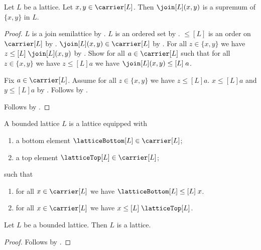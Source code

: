 \begin{proposition}\label{join_is_supremum_pair}
    Let $L$ be a lattice.
    Let $x,y\in\carrier[L]$.
    Then $\join[L](x,y)$ is a supremum of $\{x,y\}$ in $L$.
\end{proposition}
\begin{proof}
    $L$ is a join semilattice by .
    $L$ is an ordered set by .
    $\leq[L]$ is an order on $\carrier[L]$ by
        .
    $\join[L](x,y)\in\carrier[L]$ by .
    For all $z\in\{x,y\}$ we have
        $z\mathrel{\leq[L]}\join[L](x,y)$ by
        .
    Show for all $a\in\carrier[L]$ such that
        for all $z\in\{x,y\}$ we have $z\mathrel{\leq[L]}a$
        we have $\join[L](x,y)\mathrel{\leq[L]}a$.
    \begin{subproof}
        Fix $a\in\carrier[L]$.
        Assume for all $z\in\{x,y\}$ we have
            $z\mathrel{\leq[L]}a$.
        $x\mathrel{\leq[L]}a$ and $y\mathrel{\leq[L]}a$ by
            .
        Follows by .
    \end{subproof}
    Follows by
        .
\end{proof}

\begin{struct}\label{bounded_lattice}
    A bounded lattice $L$ is a lattice equipped with
    \begin{enumerate}
        \item\label{lattice_bottom_field}
            a bottom element $\latticeBottom[L]\in\carrier[L]$;
        \item\label{lattice_top_field}
            a top element $\latticeTop[L]\in\carrier[L]$;
    \end{enumerate}
    such that
    \begin{enumerate}
        \item\label{lattice_bottom_law}
            for all $x\in\carrier[L]$ we have
                $\latticeBottom[L]\mathrel{\leq[L]}x$.
        \item\label{lattice_top_law}
            for all $x\in\carrier[L]$ we have
                $x\mathrel{\leq[L]}\latticeTop[L]$.
    \end{enumerate}
\end{struct}

\begin{proposition}\label{bounded_lattice_is_lattice}
    Let $L$ be a bounded lattice.
    Then $L$ is a lattice.
\end{proposition}
\begin{proof}
    Follows by .
\end{proof}

